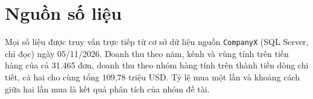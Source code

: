 \documentclass[11pt,a4paper]{article}
\begin{document}
\section{Nguồn số liệu}
Mọi số liệu được truy vấn trực tiếp từ cơ sở dữ liệu nguồn \texttt{CompanyX} (SQL Server, chỉ đọc) ngày 05/11/2026. Doanh thu theo năm, kênh và vùng tính trên tiền hàng của cả 31.465 đơn, doanh thu theo nhóm hàng tính trên thành tiền dòng chi tiết, cả hai cho cùng tổng 109,78 triệu USD. Tỷ lệ mua một lần và khoảng cách giữa hai lần mua là kết quả phân tích của nhóm đề tài.
\end{document}
